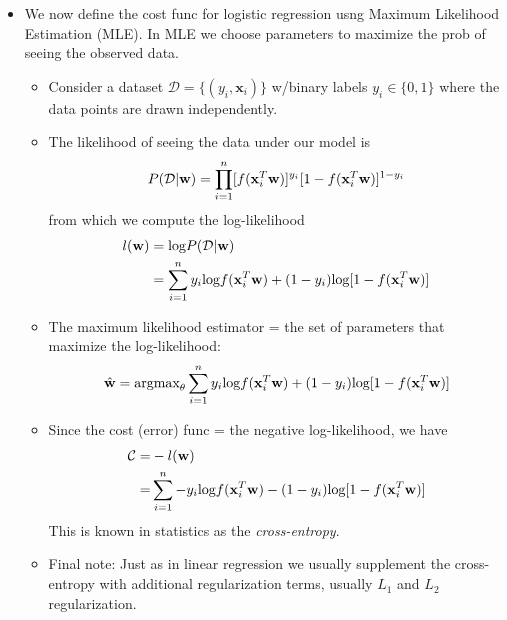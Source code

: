 \documentclass[norsk,a4paper,11pt]{article}
\begin{document}
\begin{itemize}
	\item We now define the cost func for logistic regression usng Maximum Likelihood Estimation (MLE). In MLE we choose parameters to maximize the prob of seeing the observed data.
	\begin{itemize}
		\item Consider a dataset $\mathcal{D} = \{ (y_i , \bm{x}_i)\}$ w/binary labels  $y_i \in \{ 0, 1\}$ where the data points are drawn independently.
		\item The likelihood of seeing the data under our model is
		\begin{align}
			P(\mathcal{D}|\text{\textbf{w}}) = \prod_{i=1}^n [f(\text{\textbf{x}}_i^T \text{\textbf{w}})]^{y_i} [1 - f(\text{\textbf{x}}_i^T \text{\textbf{w}})]^{1-y_i}
		\end{align} 
		from which we compute the log-likelihood
		\begin{align}
			l(\text{\textbf{w}}) &= \text{log}P(\mathcal{D}|\text{\textbf{w}}) \\
			&= \sum_{i=1}^n y_i \text{log} f(\text{\textbf{x}}_i^T \text{\textbf{w}}) + (1-y_i) \text{log} [1 - f(\text{\textbf{x}}_i^T \text{\textbf{w}})]
		\end{align}
		\item The maximum likelihood estimator = the set of parameters that maximize the log-likelihood:
		\begin{align}
			\hat{\text{\textbf{w}}}
			= \text{argmax}_\theta \sum_{i = 1}^n y_i \text{log} f(\text{\textbf{x}}_i^T \text{\textbf{w}}) + (1-y_i) \text{log} [1 - f(\text{\textbf{x}}_i^T \text{\textbf{w}})]
		\end{align}

		\item Since the cost (error) func = the negative log-likelihood, we have
		\begin{align}
			\mathcal{C} =& -l (\text{\textbf{w}}) \\
			=& \sum_{i=1}^n - y_i \text{log} f(\text{\textbf{x}}_i^T \text{\textbf{w}}) - (1-y_i) \text{log} [1 - f(\text{\textbf{x}}_i^T \text{\textbf{w}})]
		\end{align}
		This is known in statistics as the \textit{cross-entropy}.
		\item Final note: Just as in linear regression we usually supplement the cross-entropy with additional regularization terms, usually $L_1$ and $L_2$ regularization.
	\end{itemize}
\end{itemize}
\end{document}
